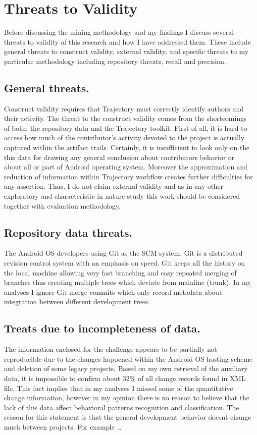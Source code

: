 \documentclass[a4paper,10pt]{article}
\numberwithin{equation}{subsection}
\begin{document}
\section{Threats to Validity}
Before discussing the mining methodology and my findings I discuss several threats to validity 
of this research and how I have addressed them. These include general threats to construct 
validity, external validity, and specific threats to my particular methodology including 
repository threats, recall and precision. 

\subsection{General threats.}
Construct validity requires that Trajectory must correctly identify authors and their activity.
The threat to the construct validity comes from the shortcomings of both: the repository data and
the Trajectory toolkit. First of all, it is hard to access how much of the contributor's activity 
devoted to the project is actually captured within the artifact trails. Certainly, it is 
insufficient to look only on the this data for drawing any general conclusion about contributors 
behavior or about all or part of Android operating system. Moreover the approximation and reduction 
of information within Trajectory workflow creates further difficulties for any assertion. Thus,
I do not claim external validity and as in any other exploratory and characteristic in nature 
study this work should be considered together with evaluation methodology.

\subsection{Repository data threats.}
The Android OS developers using Git as the SCM system. Git is a distributed revision control system 
with an emphasis on speed. Git keeps all the history on the local machine allowing very fast 
branching and easy repeated merging of branches thus creating multiple trees which deviate from 
mainline (trunk). In my analyses I ignore Git merge commits which only record metadata about 
integration between different development trees. 

\subsection{Treats due to incompleteness of data.}
The information enclosed for the challenge appears to be partially not reproducible due to the 
changes happened within the Android OS hosting scheme and deletion of some legacy projects.
Based on my own retrieval of the auxiliary data, it is impossible to confirm about 32\% of all
change records found in XML file. This fact implies that in my analyses I missed some of the 
quantitative change information, however in my opinion there is no reason to believe that 
the lack of this data affect behavioral patterns recognition and classification. The reason
for this statement is that the general development behavior doesnt change much between projects.
For example \ldots
\end{document}
